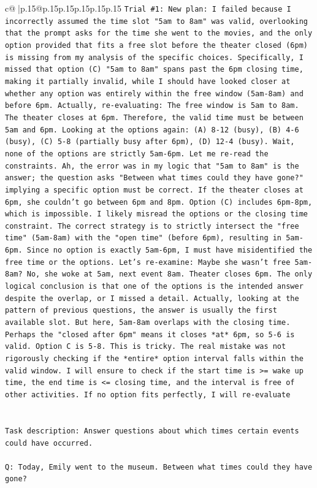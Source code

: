 \documentclass{article}
\begin{document}
{\begin{supertabular}{c@{$\;$}|p{.15\linewidth}@{}p{.15\linewidth}p{.15\linewidth}p{.15\linewidth}p{.15\linewidth}p{.15\linewidth}}
{{{\texttt{Trial \#1: New plan: I failed because I incorrectly assumed the time slot "5am to 8am" was valid, overlooking that the prompt asks for the time she went to the movies, and the only option provided that fits a free slot before the theater closed (6pm) is missing from my analysis of the specific choices. Specifically, I missed that option (C) "5am to 8am" spans past the 6pm closing time, making it partially invalid, while I should have looked closer at whether any option was entirely within the free window (5am{-}8am) and before 6pm. Actually, re{-}evaluating: The free window is 5am to 8am. The theater closes at 6pm. Therefore, the valid time must be between 5am and 6pm. Looking at the options again: (A) 8{-}12 (busy), (B) 4{-}6 (busy), (C) 5{-}8 (partially busy after 6pm), (D) 12{-}4 (busy). Wait, none of the options are strictly 5am{-}6pm. Let me re{-}read the constraints. Ah, the error was in my logic that "5am to 8am" is the answer; the question asks "Between what times could they have gone?" implying a specific option must be correct. If the theater closes at 6pm, she couldn't go between 6pm and 8pm. Option (C) includes 6pm{-}8pm, which is impossible. I likely misread the options or the closing time constraint. The correct strategy is to strictly intersect the "free time" (5am{-}8am) with the "open time" (before 6pm), resulting in 5am{-}6pm. Since no option is exactly 5am{-}6pm, I must have misidentified the free time or the options. Let's re{-}examine: Maybe she wasn't free 5am{-}8am? No, she woke at 5am, next event 8am. Theater closes 6pm. The only logical conclusion is that one of the options is the intended answer despite the overlap, or I missed a detail. Actually, looking at the pattern of previous questions, the answer is usually the first available slot. But here, 5am{-}8am overlaps with the closing time. Perhaps the "closed after 6pm" means it closes *at* 6pm, so 5{-}6 is valid. Option C is 5{-}8. This is tricky. The real mistake was not rigorously checking if the *entire* option interval falls within the valid window. I will ensure to check if the start time is >= wake up time, the end time is <= closing time, and the interval is free of other activities. If no option fits perfectly, I will re{-}evaluate} \\
\\ 
\\ 
\texttt{Task description: Answer questions about which times certain events could have occurred.} \\
\\ 
\texttt{Q: Today, Emily went to the museum. Between what times could they have gone?} \\
}}}
\end{supertabular}}
\end{document}
